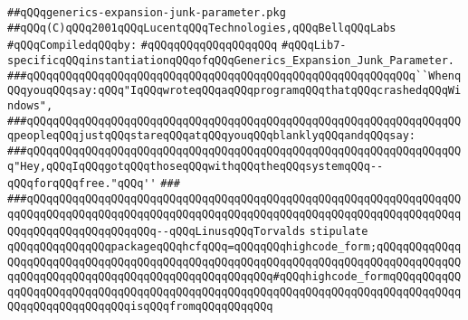 \label{src/lib/compiler/front/semantic/modules/generics-expansion-junk-parameter.pkg}
\verb|##qQQqgenerics-expansion-junk-parameter.pkg|\newline
\verb|##qQQq(C)qQQq2001qQQqLucentqQQqTechnologies,qQQqBellqQQqLabs|\newline
\newline
\verb|#qQQqCompiledqQQqby:|\newline
\verb|#qQQqqQQqqQQqqQQqqQQq|\newline
\newline
\newline
\newline
\verb|#qQQqLib7-specificqQQqinstantiationqQQqofqQQqGenerics_Expansion_Junk_Parameter.|\newline
\newline
\newline
\newline
\verb|###qQQqqQQqqQQqqQQqqQQqqQQqqQQqqQQqqQQqqQQqqQQqqQQqqQQqqQQqqQQq``WhenqQQqyouqQQqsay:qQQq"IqQQqwroteqQQqaqQQqprogramqQQqthatqQQqcrashedqQQqWindows",|\newline
\verb|###qQQqqQQqqQQqqQQqqQQqqQQqqQQqqQQqqQQqqQQqqQQqqQQqqQQqqQQqqQQqqQQqqQQqpeopleqQQqjustqQQqstareqQQqatqQQqyouqQQqblanklyqQQqandqQQqsay:|\newline
\verb|###qQQqqQQqqQQqqQQqqQQqqQQqqQQqqQQqqQQqqQQqqQQqqQQqqQQqqQQqqQQqqQQqqQQq"Hey,qQQqIqQQqgotqQQqthoseqQQqwithqQQqtheqQQqsystemqQQq--qQQqforqQQqfree."qQQq''|\newline
\verb|###|\newline
\verb|###qQQqqQQqqQQqqQQqqQQqqQQqqQQqqQQqqQQqqQQqqQQqqQQqqQQqqQQqqQQqqQQqqQQqqQQqqQQqqQQqqQQqqQQqqQQqqQQqqQQqqQQqqQQqqQQqqQQqqQQqqQQqqQQqqQQqqQQqqQQqqQQqqQQqqQQqqQQqqQQq--qQQqLinusqQQqTorvalds|\newline
\newline
\newline
\newline
\verb|stipulate|\newline
\verb|qQQqqQQqqQQqqQQqpackageqQQqhcfqQQq=qQQqqQQqhighcode_form;qQQqqQQqqQQqqQQqqQQqqQQqqQQqqQQqqQQqqQQqqQQqqQQqqQQqqQQqqQQqqQQqqQQqqQQqqQQqqQQqqQQqqQQqqQQqqQQqqQQqqQQqqQQqqQQqqQQqqQQqqQQq#qQQqhighcode_formqQQqqQQqqQQqqQQqqQQqqQQqqQQqqQQqqQQqqQQqqQQqqQQqqQQqqQQqqQQqqQQqqQQqqQQqqQQqqQQqqQQqqQQqqQQqqQQqqQQqisqQQqfromqQQqqQQqqQQq|\newline
